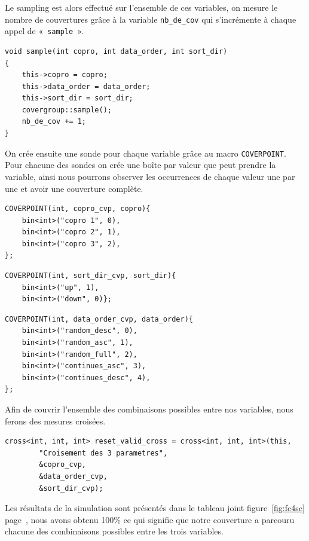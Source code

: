 \documentclass[a4paper, 10pt]{article}
\begin{document}
\begin{enumerate}
		Le sampling est alors effectué sur l’ensemble de ces variables, on mesure le
		nombre de 
		couvertures grâce à la variable \texttt{nb\_de\_cov} qui s’incrémente à chaque
		appel de « \texttt{sample} ».

\begin{lstlisting}[numbers=none]
void sample(int copro, int data_order, int sort_dir)
{
	this->copro = copro;
	this->data_order = data_order;
	this->sort_dir = sort_dir;
	covergroup::sample();
	nb_de_cov += 1;
}
\end{lstlisting}

		On crée ensuite une sonde pour chaque variable grâce au macro \texttt{COVERPOINT}. Pour
		chacune des sondes on crée une boîte par valeur que peut prendre la variable,
		ainsi nous pourrons observer les occurrences de chaque valeur une par une et avoir
		une couverture complète.

\begin{multicols}{2}
\begin{lstlisting}[numbers=none]
COVERPOINT(int, copro_cvp, copro){
	bin<int>("copro 1", 0),
	bin<int>("copro 2", 1),
	bin<int>("copro 3", 2),
};
\end{lstlisting}
\begin{lstlisting}[numbers=none]
COVERPOINT(int, sort_dir_cvp, sort_dir){
	bin<int>("up", 1),
	bin<int>("down", 0)};
\end{lstlisting}	
\begin{lstlisting}[numbers=none]
COVERPOINT(int, data_order_cvp, data_order){
	bin<int>("random_desc", 0),
	bin<int>("random_asc", 1),
	bin<int>("random_full", 2),
	bin<int>("continues_asc", 3),
	bin<int>("continues_desc", 4),
};
\end{lstlisting}
\end{multicols}

		Afin de couvrir l’ensemble des combinaisons possibles entre nos variables, nous
		ferons des mesures croisées.

\begin{lstlisting}[numbers=none]
cross<int, int, int> reset_valid_cross = cross<int, int, int>(this,
		"Croisement des 3 parametres",
		&copro_cvp,
		&data_order_cvp,
		&sort_dir_cvp);
\end{lstlisting}

		Les résultats de la simulation sont présentés dans le tableau joint
		figure~\ref{fig:fc4sc} page~\pageref{fig:fc4sc}, nous avons obtenu 100\% ce qui
		signifie que notre couverture a parcouru chacune des combinaisons possibles entre
		les trois variables.


\end{enumerate}
\end{document}
